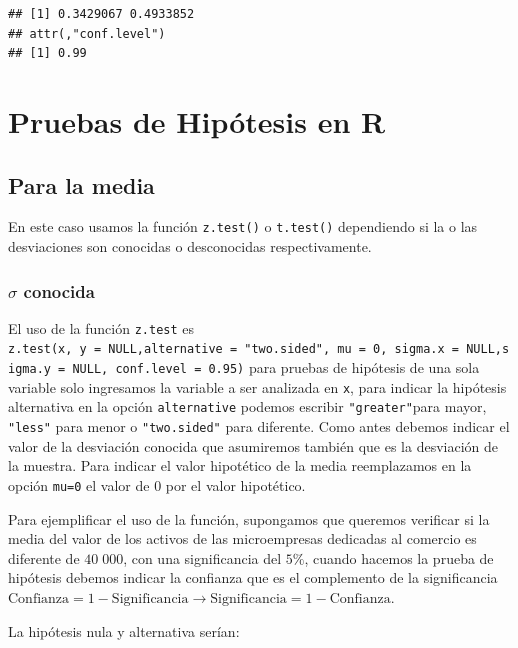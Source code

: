 \documentclass[
]{krantz}
\begin{document}
\begin{verbatim}
## [1] 0.3429067 0.4933852
## attr(,"conf.level")
## [1] 0.99
\end{verbatim}

\hypertarget{pruebas-de-hipotesis-en-r}{%
\section{Pruebas de Hipótesis en R}\label{pruebas-de-hipotesis-en-r}}

\hypertarget{para-la-media-1}{%
\subsection{Para la media}\label{para-la-media-1}}

En este caso usamos la función \texttt{z.test()} o \texttt{t.test()} dependiendo si la o las desviaciones son conocidas o desconocidas respectivamente.

\hypertarget{sigma-conocida}{%
\subsubsection{\texorpdfstring{\(\sigma\) conocida}{\textbackslash{}sigma conocida}}\label{sigma-conocida}}

El uso de la función \texttt{z.test} es \texttt{z.test(x,\ y\ =\ NULL,alternative\ =\ "two.sided",\ mu\ =\ 0,\ sigma.x\ =\ NULL,sigma.y\ =\ NULL,\ conf.level\ =\ 0.95)} para pruebas de hipótesis de una sola variable solo ingresamos la variable a ser analizada en \texttt{x}, para indicar la hipótesis alternativa en la opción \texttt{alternative} podemos escribir \texttt{"greater"}para mayor, \texttt{"less"} para menor o \texttt{"two.sided"} para diferente. Como antes debemos indicar el valor de la desviación conocida que asumiremos también que es la desviación de la muestra.
Para indicar el valor hipotético de la media reemplazamos en la opción \texttt{mu=0} el valor de \(0\) por el valor hipotético.

Para ejemplificar el uso de la función, supongamos que queremos verificar si la media del valor de los activos de las microempresas dedicadas al comercio es diferente de \(40\;000\), con una significancia del \(5\%\), cuando hacemos la prueba de hipótesis debemos indicar la confianza que es el complemento de la significancia \(\text{Confianza}=1- \text{Significancia} \rightarrow \text{Significancia}=1-\text{Confianza}\).

La hipótesis nula y alternativa serían:
\end{document}
